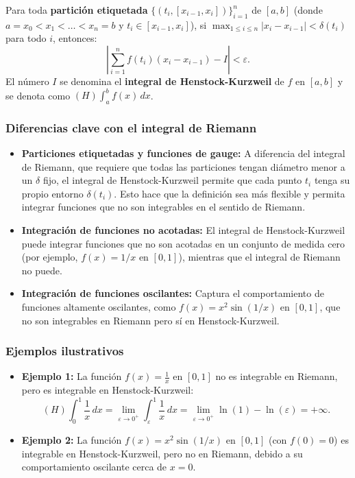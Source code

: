 \documentclass[12pt, a4paper]{article}
\theoremstyle{rioplatense}
\begin{document}
Para toda \textbf{partición etiquetada} $\{(t_i, [x_{i-1}, x_i])\}_{i=1}^n$ de $[a,b]$ (donde $a = x_0 < x_1 < \dots < x_n = b$ y $t_i \in [x_{i-1}, x_i]$), si $\max_{1 \leq i \leq n} |x_i - x_{i-1}| < \delta(t_i)$ para todo $i$, entonces:
\[
\left| \sum_{i=1}^n f(t_i)(x_i - x_{i-1}) - I \right| < \varepsilon.
\]
El número $I$ se denomina el \textbf{integral de Henstock-Kurzweil} de $f$ en $[a,b]$ y se denota como $(H)\int_a^b f(x) \, dx$.

\subsubsection{Diferencias clave con el integral de Riemann}
\begin{itemize}
    \item \textbf{Particiones etiquetadas y funciones de gauge:} A diferencia del integral de Riemann, que requiere que todas las particiones tengan diámetro menor a un $\delta$ fijo, el integral de Henstock-Kurzweil permite que cada punto $t_i$ tenga su propio entorno $\delta(t_i)$. Esto hace que la definición sea más flexible y permita integrar funciones que no son integrables en el sentido de Riemann.

    \item \textbf{Integración de funciones no acotadas:} El integral de Henstock-Kurzweil puede integrar funciones que no son acotadas en un conjunto de medida cero (por ejemplo, $f(x) = 1/x$ en $[0,1]$), mientras que el integral de Riemann no puede.

    \item \textbf{Integración de funciones oscilantes:} Captura el comportamiento de funciones altamente oscilantes, como $f(x) = x^2 \sin(1/x)$ en $[0,1]$, que no son integrables en Riemann pero sí en Henstock-Kurzweil.
\end{itemize}

\subsubsection{Ejemplos ilustrativos}
\begin{itemize}
    \item \textbf{Ejemplo 1:} La función $f(x) = \frac{1}{x}$ en $[0,1]$ no es integrable en Riemann, pero es integrable en Henstock-Kurzweil:
    \[
    (H)\int_0^1 \frac{1}{x} \, dx = \lim_{\varepsilon \to 0^+} \int_\varepsilon^1 \frac{1}{x} \, dx = \lim_{\varepsilon \to 0^+} \ln(1) - \ln(\varepsilon) = +\infty.
    \]

    \item \textbf{Ejemplo 2:} La función $f(x) = x^2 \sin(1/x)$ en $[0,1]$ (con $f(0)=0$) es integrable en Henstock-Kurzweil, pero no en Riemann, debido a su comportamiento oscilante cerca de $x=0$.
\end{itemize}
\end{document}
